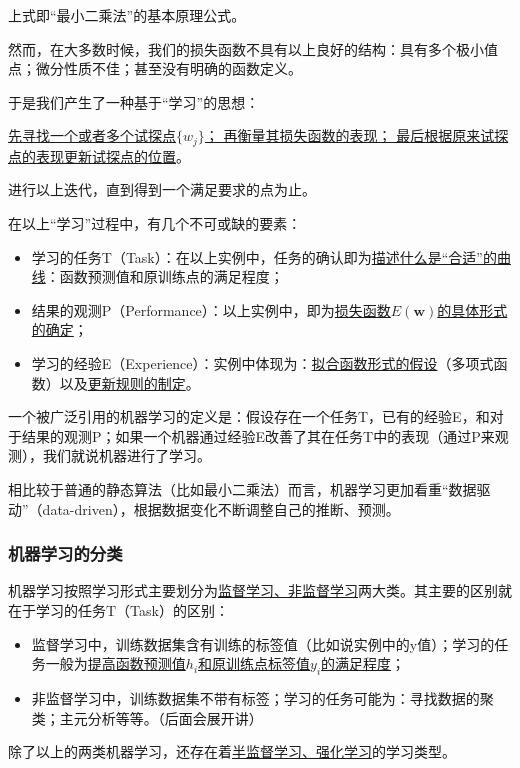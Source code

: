 上式即“最小二乘法”的基本原理公式。

然而，在大多数时候，我们的损失函数不具有以上良好的结构：具有多个极小值点；微分性质不佳；甚至没有明确的函数定义。 

于是我们产生了一种基于“学习”的思想：

\uline{先寻找一个或者多个试探点$\{w_j\}$； 再衡量其损失函数的表现； 最后根据原来试探点的表现更新试探点的位置}。 

进行以上迭代，直到得到一个满足要求的点为止。

在以上“学习”过程中，有几个不可或缺的要素：
\begin{itemize}
\item 学习的任务T（Task）：在以上实例中，任务的确认即为\uline{描述什么是“合适”的曲线}：函数预测值和原训练点的满足程度；
\item 结果的观测P（Performance）：以上实例中，即为\uline{损失函数$E(\mathbf{w})$的具体形式的确定}；
\item 学习的经验E（Experience）：实例中体现为：\uline{拟合函数形式的假设}（多项式函数）以及\uline{更新规则的制定}。
\end{itemize}

一个被广泛引用的机器学习的定义是\cite{mitchell1997machine}：假设存在一个任务T，已有的经验E，和对于结果的观测P；如果一个机器通过经验E改善了其在任务T中的表现（通过P来观测），我们就说机器进行了学习。



相比较于普通的静态算法（比如最小二乘法）而言，机器学习更加看重“数据驱动”（data-driven），根据数据变化不断调整自己的推断、预测。


\subsubsection{机器学习的分类}
机器学习按照学习形式主要划分为\uline{监督学习、非监督学习}两大类。其主要的区别就在于学习的任务T（Task）的区别：

\begin{itemize}
\item 监督学习中，训练数据集含有训练的标签值（比如说实例中的y值）；学习的任务一般为\uline{提高函数预测值$h_i$和原训练点标签值$y_i$的满足程度}；
\item 非监督学习中，训练数据集不带有标签；学习的任务可能为：寻找数据的聚类；主元分析等等。（后面会展开讲）
\end{itemize}

除了以上的两类机器学习，还存在着\uline{半监督学习、强化学习}的学习类型。


